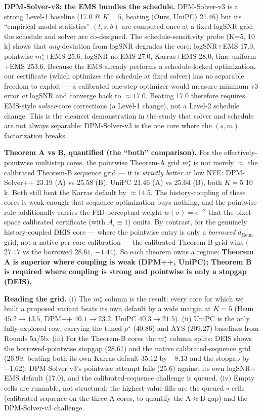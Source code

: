 \documentclass[11pt]{article}
\begin{document}
\noindent\textbf{DPM-Solver-v3: the EMS bundles the schedule.} DPM-Solver-v3
is a strong Level-1 baseline (17.0 @ \(K{=}5\), beating (Ours, UniPC)
21.46) but its ``empirical model statistics'' \((l,s,b)\) are computed
once at a fixed logSNR grid; the schedule and solver are co-designed.
The schedule-sensitivity probe (K=5, 10\,k) shows that \emph{any}
deviation from logSNR degrades the core: logSNR\(+\)EMS 17.0,
pointwise-\(m_s^\star\)\(+\)EMS 25.6, logSNR no-EMS 27.0, Karras\(+\)EMS
28.0, time-uniform\(+\)EMS 253.6. Because the EMS already performs a
schedule-locked optimization, our certificate (which optimizes the
schedule at fixed solver) has no separable freedom to exploit --- a
calibrated one-step optimizer would measure minimum v3 error \emph{at}
logSNR and converge back to \(\approx 17.0\). Beating 17.0 therefore
requires EMS-style \emph{solver}-core corrections (a Level-1 change),
not a Level-2 schedule change. This is the cleanest demonstration in the
study that solver and schedule are not always separable: DPM-Solver-v3
is the one core where the \((s, m)\) factorization breaks.

\noindent\textbf{Theorem A vs B, quantified (the ``both'' comparison).}
For the effectively-pointwise multistep cores, the pointwise Theorem-A
grid \(m_s^\star\) is not merely \(\approx\) the calibrated Theorem-B
sequence grid --- it is \emph{strictly better} at low NFE: DPM-Solver++
23.19 (A) vs 25.58 (B), UniPC 21.46 (A) vs 25.64 (B), both \(K{=}5\)
10\,k. Both still beat the Karras default by \(\approx 14.5\). The
history-coupling of these cores is weak enough that sequence
optimization buys nothing, and the pointwise rule additionally carries
the FID-perceptual weight \(w(\sigma){=}\sigma^{-2}\) that the
pixel-space calibrated certificate (with \(A_i{\equiv}1\)) omits. By
contrast, for the genuinely history-coupled DEIS core --- where the
pointwise entry is only a \emph{borrowed} \(d_{\mathrm{Heun}}\) grid, not
a native per-core calibration --- the calibrated Theorem-B grid wins
(\(27.17\) vs the borrowed \(28.61\), \(-1.44\)). So each theorem owns a
regime: \textbf{Theorem A is superior where coupling is weak
(DPM++, UniPC); Theorem B is required where coupling is strong and
pointwise is only a stopgap (DEIS).}

\noindent\textbf{Reading the grid.} (i) The \(m_s^\star\) column is the
result: every core for which we built a proposed variant beats its own
default by a wide margin at \(K{=}5\) (Heun \(45.2{\to}13.5\), DPM++
\(40.1{\to}23.2\), UniPC \(40.3{\to}21.5\)). (ii) UniPC is the only
fully-explored row, carrying the tuned-\(\rho^\star\) (40.86) and AYS
(209.27) baselines from Rounds 5a/5b. (iii) For the Theorem-B cores the
\(m_s^\star\) column splits: DEIS shows the borrowed-pointwise stopgap
(28.61) and the native calibrated-sequence grid (26.99, beating both its
own Karras default \(35.12\) by \(-8.13\) and the stopgap by \(-1.62\));
DPM-Solver-v3's pointwise attempt fails (25.6) against its own
logSNR\(+\)EMS default (17.0), and the calibrated-sequence challenge is
queued. (iv) Empty cells are runnable, not structural: the highest-value
fills are the queued \(\circ\) cells (calibrated-sequence on the three
A-cores, to quantify the A\(\approx\)B gap) and the DPM-Solver-v3
challenge.
\end{document}
